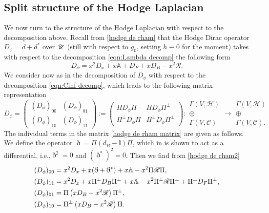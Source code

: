 \documentclass[11pt]{article}
\newcommand{\ie}{i.e.,\xspace}
\numberwithin{equation}{section}
\theoremstyle{plain}
\theoremstyle{definition}
\begin{document}
\subsection{Split structure of the Hodge Laplacian} \label{subsec:split hodge}
We now turn to the structure of the Hodge Laplacian with respect to the decomposition above.
Recall from \eqref{hodge de rham} that the Hodge Dirac operator $D_\phi = d + d^{*}$ over $\mathscr{U}$
(still with respect to $g_0$, setting $h\equiv 0$ for the moment)
takes with respect to the decomposition \eqref{eqn:Lambda decomp} the following form
\begin{equation}\label{hodge de rham2}
D_\phi = x^{2}D_{x} + x \mathbb{A} + D_{F} + xD_{B}
-x^{2}\mathscr{R}.
\end{equation}
We consider now as in \cite{gravi-ins}
the decomposition of $D_\phi$ with respect to the
decomposition \eqref{eqn:Cinf decomp}, which leads to the following
matrix representation
\begin{equation}\label{hodge de rham matrix}
D_\phi =
\begin{pmatrix}
(D_\phi)_{00} & (D_\phi)_{01}\\
(D_\phi)_{10} & (D_\phi)_{11}
\end{pmatrix} :=
\begin{pmatrix}
\Pi D_\phi \Pi & \Pi D_\phi \Pi^{\bot}\\
\Pi^{\bot} D_\phi \Pi & \Pi^{\bot} D_\phi \Pi^{\bot}
\end{pmatrix}
:
\begin{matrix}
\Gamma(V,\mathscr{H}) \\ \oplus \\ \Gamma(V,\mathscr{C})
\end{matrix}
\to
\begin{matrix}
\Gamma(V,\mathscr{H}) \\ \oplus \\ \Gamma(V,\mathscr{C}).
\end{matrix}
\end{equation}
The individual terms in the matrix \eqref{hodge de rham matrix} are given as follows.
We define the operator $\eth = \Pi(d_{B} - \mathbb{I})\Pi$,
which in \cite[Prop.\,15]{gravi-ins} is shown to act as a differential, \ie $\eth^{2} =0$ and $(\eth^{*})^{2} = 0$.
Then we find from \eqref{hodge de rham2}
\begin{align}
&(D_\phi)_{00} =
x^2 D_{x} + x(\eth + \eth^{*}) + x \mathbb{A} - x^{2} \Pi \mathscr{R}\Pi,\\
& (D_\phi)_{11} =
x^{2}D_{x} + x \Pi^{\bot}D_{B}\Pi^{\bot} + x \mathbb{A} - x^{2}\Pi^{\bot} \mathscr{R} \Pi^{\bot} + \Pi^{\bot} D_F \Pi^{\bot},\\\label{D_{01}}
&(D_\phi)_{01} =
\Pi\left(xD_{B} - x^{2} \mathscr{R}\right) \Pi^{\bot},\\ \label{D_{10}}
&(D_\phi)_{10} =
\Pi^{\bot}\left(xD_{B} - x^{2} \mathscr{R}\right) \Pi.
\end{align}
\end{document}
